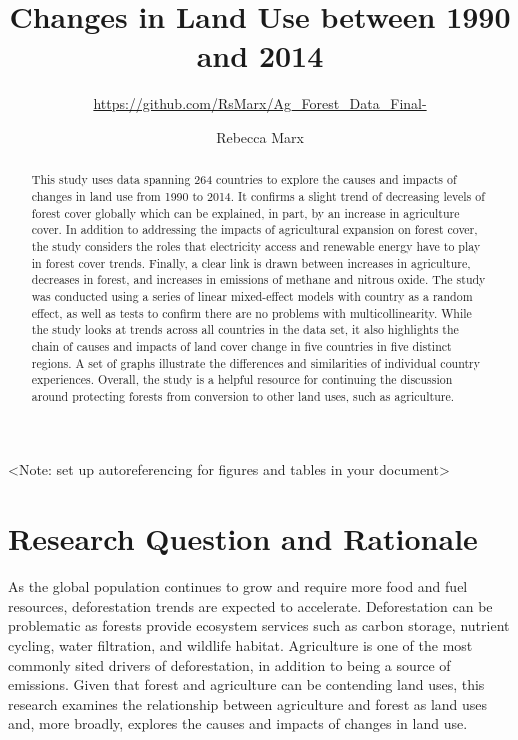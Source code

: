 \documentclass[12pt,]{article}
\title{Changes in Land Use between 1990 and 2014}
\subtitle{\url{https://github.com/RsMarx/Ag_Forest_Data_Final-}}
\author{Rebecca Marx}
\date{}
\begin{document}
\maketitle
\begin{abstract}
This study uses data spanning 264 countries to explore the causes and
impacts of changes in land use from 1990 to 2014. It confirms a slight
trend of decreasing levels of forest cover globally which can be
explained, in part, by an increase in agriculture cover. In addition to
addressing the impacts of agricultural expansion on forest cover, the
study considers the roles that electricity access and renewable energy
have to play in forest cover trends. Finally, a clear link is drawn
between increases in agriculture, decreases in forest, and increases in
emissions of methane and nitrous oxide. The study was conducted using a
series of linear mixed-effect models with country as a random effect, as
well as tests to confirm there are no problems with multicollinearity.
While the study looks at trends across all countries in the data set, it
also highlights the chain of causes and impacts of land cover change in
five countries in five distinct regions. A set of graphs illustrate the
differences and similarities of individual country experiences. Overall,
the study is a helpful resource for continuing the discussion around
protecting forests from conversion to other land uses, such as
agriculture.
\end{abstract}

\newpage

\tableofcontents  \newpage
\listoftables  \newpage
\listoffigures  \newpage

\textless{}Note: set up autoreferencing for figures and tables in your
document\textgreater{}

\section{Research Question and
Rationale}\label{research-question-and-rationale}

As the global population continues to grow and require more food and
fuel resources, deforestation trends are expected to accelerate.
Deforestation can be problematic as forests provide ecosystem services
such as carbon storage, nutrient cycling, water filtration, and wildlife
habitat. Agriculture is one of the most commonly sited drivers of
deforestation, in addition to being a source of emissions. Given that
forest and agriculture can be contending land uses, this research
examines the relationship between agriculture and forest as land uses
and, more broadly, explores the causes and impacts of changes in land
use.
\end{document}
